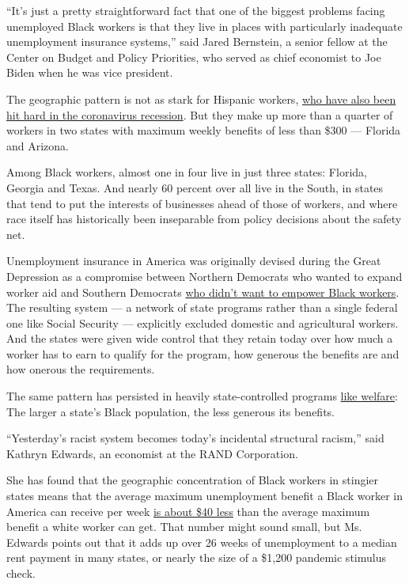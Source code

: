 ``It's just a pretty straightforward fact that one of the biggest
problems facing unemployed Black workers is that they live in places
with particularly inadequate unemployment insurance systems,'' said
Jared Bernstein, a senior fellow at the Center on Budget and Policy
Priorities, who served as chief economist to Joe Biden when he was vice
president.

The geographic pattern is not as stark for Hispanic workers,
\href{https://www.pewresearch.org/hispanic/2020/08/04/coronavirus-economic-downturn-has-hit-latinos-especially-hard/}{who
have also been hit hard in the coronavirus recession}. But they make up
more than a quarter of workers in two states with maximum weekly
benefits of less than \$300 --- Florida and Arizona.

Among Black workers, almost one in four live in just three states:
Florida, Georgia and Texas. And nearly 60 percent over all live in the
South, in states that tend to put the interests of businesses ahead of
those of workers, and where race itself has historically been
inseparable from policy decisions about the safety net.

Unemployment insurance in America was originally devised during the
Great Depression as a compromise between Northern Democrats who wanted
to expand worker aid and Southern Democrats
\href{https://www.nytimes.com/2005/08/28/books/review/when-affirmative-action-was-white-uncivil-rights.html}{who
didn't want to empower Black workers}. The resulting system --- a
network of state programs rather than a single federal one like Social
Security --- explicitly excluded domestic and agricultural workers. And
the states were given wide control that they retain today over how much
a worker has to earn to qualify for the program, how generous the
benefits are and how onerous the requirements.

The same pattern has persisted in heavily state-controlled programs
\href{https://www.urban.org/research/publication/why-does-cash-welfare-depend-where-you-live}{like
welfare}: The larger a state's Black population, the less generous its
benefits.

``Yesterday's racist system becomes today's incidental structural
racism,'' said Kathryn Edwards, an economist at the RAND Corporation.

She has found that the geographic concentration of Black workers in
stingier states means that the average maximum unemployment benefit a
Black worker in America can receive per week
\href{https://www.rand.org/blog/2020/07/the-racial-disparity-in-unemployment-benefits.html}{is
about \$40 less} than the average maximum benefit a white worker can
get. That number might sound small, but Ms. Edwards points out that it
adds up over 26 weeks of unemployment to a median rent payment in many
states, or nearly the size of a \$1,200 pandemic stimulus check.

